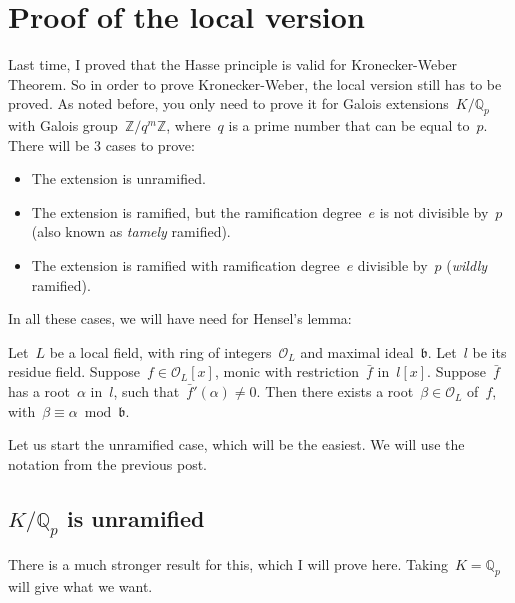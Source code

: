 \section{Proof of the local version}

Last time, I proved that the Hasse principle is valid for Kronecker-Weber Theorem. So in order to prove Kronecker-Weber, the local version still has to be proved. As noted before, you only need to prove it for Galois extensions~$K/\mathbb{Q}_p$ with Galois group~$\mathbb{Z}/q^m\mathbb{Z}$, where~$q$ is a prime number that can be equal to~$p$. There will be 3 cases to prove:
\begin{itemize}
  \item The extension is unramified.
  \item The extension is ramified, but the ramification degree~$e$ is not divisible by~$p$ (also known as \emph{tamely} ramified).
  \item The extension is ramified with ramification degree~$e$ divisible by~$p$ (\emph{wildly} ramified).
\end{itemize}
In all these cases, we will have need for Hensel's lemma:

\begin{lemma}
  Let~$L$ be a local field, with ring of integers~$\mathcal{O}_L$ and maximal ideal~$\mathfrak{b}$. Let~$l$ be its residue field. Suppose~$f \in \mathcal{O}_L [x]$, monic with restriction~$\bar{f}$ in~$l[x]$. Suppose~$\bar{f}$ has a root~$\alpha$ in~$l$, such that~$\bar{f}'(\alpha) \neq 0$. Then there exists a root~$\beta \in \mathcal{O}_L$ of~$f$, with~$\beta \equiv \alpha \bmod \mathfrak{b}$.
\end{lemma}

Let us start the unramified case, which will be the easiest. We will use the notation from the previous post.

\subsection{$K/\mathbb{Q}_p$ is unramified}
There is a much stronger result for this, which I will prove here. Taking~$K = \mathbb{Q}_p$ will give what we want.

